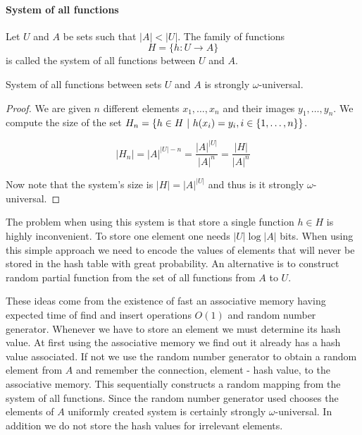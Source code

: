 \paragraph{System of all functions}
\begin{definition}
Let $U$ and $A$ be sets such that $|A| < |U|$. The family of functions
\[
H = \{h: U \rightarrow A \}
\]
is called the system of all functions between $U$ and $A$.
\end{definition}

\begin{remark}
System of all functions between sets $U$ and $A$ is strongly $\omega$-universal.
\end{remark}
\begin{proof}
We are given $n$ different elements $x_1, \dots, x_n$ and their images $y_1, \dots, y_n$. We compute the size of the set $H_n = \lbrace h \in H \ | \  h(x_i) = y_i, i \in \lbrace 1, \dots, n \rbrace \rbrace$.

\begin{displaymath}
|H_n| = {|A|}^{|U| - n} = \frac{{|A|}^{|U|}}{{|A|}^{n}} = \frac{|H|}{|A|^n}
\end{displaymath}

Now note that the system's size is $|H| = {|A|}^{|U|}$ and thus is it strongly $\omega$-universal.
\end{proof}

The problem when using this system is that store a single function $h \in H$ is highly inconvenient. To store one element one needs $|U| \log |A|$ bits. When using this simple approach we need to encode the values of elements that will never be stored in the hash table with great probability. An alternative is to construct random partial function from the set of all functions from $A$ to $U$. 

These ideas come from the existence of fast an associative memory having expected time of find and insert operations $O(1)$ and random number generator. Whenever we have to store an element we must determine its hash value. At first using the associative memory we find out it already has a hash value associated. If not we use the random number generator to obtain a random element from $A$ and remember the connection, element - hash value, to the associative memory. This sequentially constructs a random mapping from the system of all functions. Since the random number generator used chooses the elements of $A$ uniformly created system is certainly strongly $\omega$-universal. In addition we do not store the hash values for irrelevant elements.

